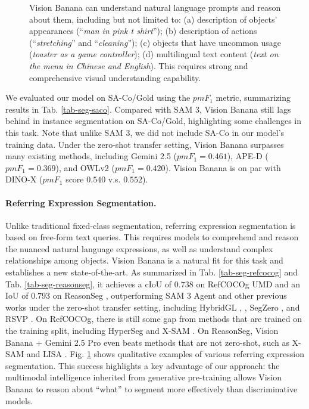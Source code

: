 \documentclass[11pt, a4paper, copyright, gdm]{google}
\begin{document}
\begin{figure}[!t]
    \caption{Vision Banana can understand natural language prompts and reason about them, including but not limited to: (a) description of objects' appearances (``\textit{man in pink t shirt}''); (b) description of actions (``\textit{stretching}'' and ``\textit{cleaning}''); (c) objects that have uncommon usage (\textit{toaster as a game controller}); (d) multilingual text content (\textit{text on the menu in Chinese and English}). This requires strong and comprehensive visual understanding capability.
    }
    \label{fig:refseg-demo}
\end{figure}

We evaluated our model on SA-Co/Gold \citep{sam3} using the $pmF_1$ metric, summarizing results in Tab. \ref{tab-seg-saco}.
Compared with SAM 3, Vision Banana still lags behind in instance segmentation on SA-Co/Gold, highlighting some challenges in this task. Note that unlike SAM 3, we did not include SA-Co in our model's training data. 
Under the zero-shot transfer setting,
Vision Banana surpasses many existing methods, including Gemini 2.5 \citep{gemini25} ($pmF_1=0.461$), APE-D \citep{shen2024_aped} ($pmF_1=0.369$), and OWLv2 \citep{minderer2023gowol} ($pmF_1=0.420$).
Vision Banana is on par with DINO-X \citep{ren2024dinox} ($pmF_1$ score $0.540$ v.s. $0.552$).



\paragraph{Referring Expression Segmentation.} 




Unlike traditional fixed-class segmentation, referring expression segmentation is based on free-form text queries. This requires models to comprehend and reason the nuanced natural language expressions, as well as understand complex relationships among objects.
Vision Banana is a natural fit for this task and establishes a new state-of-the-art. As summarized in Tab. \ref{tab-seg-refcocog} and Tab. \ref{tab-seg-reasonseg}, it achieves a cIoU of $0.738$ on RefCOCOg UMD \citep{refcoco} and an IoU of $0.793$ on ReasonSeg \citep{reasonseg}, outperforming SAM 3 Agent \citep{sam3} and other previous works under the zero-shot transfer setting, including HybridGL \citep{liu2025hybrid}, \cite{kang2025your}, SegZero \citep{liu2025segzero}, and RSVP \citep{lu2025rsvp}. 
On RefCOCOg, there is still some gap from methods that are trained on the training split, including HyperSeg \citep{wei2024hyperseg} and X-SAM \citep{wang2026xsam}.
On ReasonSeg, Vision Banana + Gemini 2.5 Pro even beats methods that are not zero-shot, such as X-SAM \citep{wang2026xsam} and LISA \citep{reasonseg}.
Fig. \ref{fig:refseg-demo} shows qualitative examples of various referring expression segmentation. 
This success highlights a key advantage of our approach: the multimodal intelligence inherited from generative pre-training allows Vision Banana to reason about ``what'' to segment more effectively than discriminative models.
\end{document}
